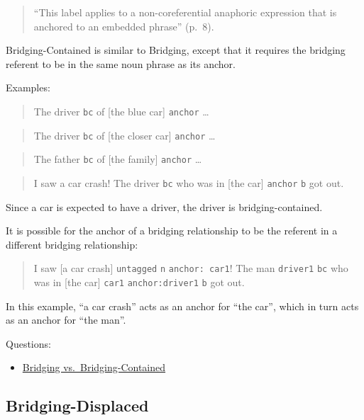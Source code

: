 \documentclass[
]{book}
\providecommand{\tightlist}{%
  \setlength{\itemsep}{0pt}\setlength{\parskip}{0pt}}
\begin{document}
\begin{quote}
``This label applies to a non-coreferential anaphoric expression that is anchored to an embedded phrase'' (p.~8).
\end{quote}

Bridging-Contained is similar to Bridging, except that it requires the bridging referent to be in the same noun phrase as its anchor.

Examples:

\begin{quote}
The driver \texttt{bc} of {[}the blue car{]} \texttt{anchor} \ldots{}
\end{quote}

\begin{quote}
The driver \texttt{bc} of {[}the closer car{]} \texttt{anchor} \ldots{}
\end{quote}

\begin{quote}
The father \texttt{bc} of {[}the family{]} \texttt{anchor} \ldots{}
\end{quote}

\begin{quote}
I saw a car crash!
The driver \texttt{bc} who was in {[}the car{]} \texttt{anchor} \texttt{b} got out.
\end{quote}

Since a car is expected to have a driver,
the driver is bridging-contained.

It is possible for the anchor of a bridging relationship to be the referent in a different bridging relationship:

\begin{quote}
I saw {[}a car crash{]} \texttt{untagged} \texttt{n} \texttt{anchor:\ car1}!
The man \texttt{driver1} \texttt{bc} who was in {[}the car{]} \texttt{car1} \texttt{anchor:driver1} \texttt{b} got out.
\end{quote}

In this example, ``a car crash'' acts as an anchor for ``the car'',
which in turn acts as an anchor for ``the man''.

Questions:

\begin{itemize}
\tightlist
\item
  \protect\hyperlink{bridging-vs.-bridging-contained}{Bridging vs.~Bridging-Contained}
\end{itemize}

\hypertarget{bridging-displaced}{%
\subsection{Bridging-Displaced}\label{bridging-displaced}}
\end{document}
